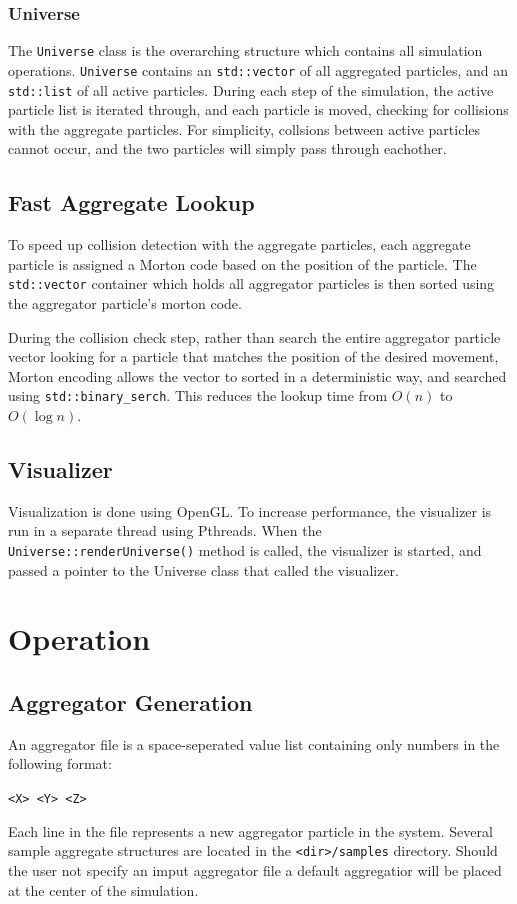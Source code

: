 \documentclass[fleqn,10pt]{SelfArx} %
\begin{document}
\subsubsection{Universe}
The \texttt{Universe} class is the overarching structure which contains all simulation operations. \texttt{Universe} contains an \texttt{std\allowbreak::vector} of all aggregated particles, and an \texttt{std\allowbreak::list} of all active particles. During each step of the simulation, the active particle list is iterated through, and each particle is moved, checking for collisions with the aggregate particles. For simplicity, collsions between active particles cannot occur, and the two particles will simply pass through eachother. 

\subsection{Fast Aggregate Lookup}
To speed up collision detection with the aggregate particles, each aggregate particle is assigned a Morton code based on the position of the particle. The \texttt{std\allowbreak::vector} container which holds all aggregator particles is then sorted using the aggregator particle's morton code.

During the collision check step, rather than search the entire aggregator particle vector looking for a particle that matches the position of the desired movement, Morton encoding allows the vector to sorted in a deterministic way, and searched using \texttt{std\allowbreak::binary\_serch}. This reduces the lookup time from $O(n)$ to $O(\log n)$.
\subsection{Visualizer}
Visualization is done using OpenGL. To increase performance, the visualizer is run in a separate thread using Pthreads. When the \texttt{Universe\allowbreak::renderUniverse()} method is called, the visualizer is started, and passed a pointer to the Universe class that called the visualizer.



\section{Operation}
\subsection{Aggregator Generation}
An aggregator file is a space-seperated value list containing only numbers in the following format:
\begin{center}
    \texttt{<X> <Y> <Z>}
\end{center}
Each line in the file represents a new aggregator particle in the system. Several sample aggregate structures are located in the \texttt{<dir>/samples} directory. Should the user not specify an imput aggregator file a default aggregatior will be placed at the center of the simulation. 
\end{document}
